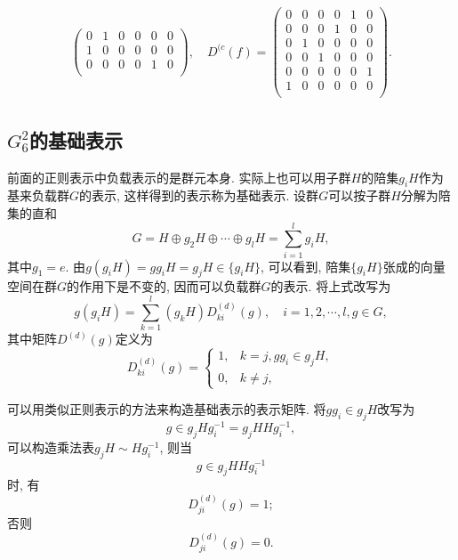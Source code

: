 \documentclass[UTF8]{ctexart}
\begin{document}
\begin{gather}
\begin{pmatrix}
    0 & 1 & 0 & 0 & 0 & 0 \\
    1 & 0 & 0 & 0 & 0 & 0 \\
    0 & 0 & 0 & 0 & 1 & 0 \\
  \end{pmatrix}, \quad
  D^{(c}(f) =
  \begin{pmatrix}
    0 & 0 & 0 & 0 & 1 & 0 \\
    0 & 0 & 0 & 1 & 0 & 0 \\
    0 & 1 & 0 & 0 & 0 & 0 \\
    0 & 0 & 1 & 0 & 0 & 0 \\
    0 & 0 & 0 & 0 & 0 & 1 \\
    1 & 0 & 0 & 0 & 0 & 0 \\
  \end{pmatrix}.
\end{gather}
\subsection{$G_6^2$的基础表示}
前面的正则表示中负载表示的是群元本身. 实际上也可以用子群$H$的陪集$g_i H$作为基来负载群$G$的表示, 这样得到的表示称为基础表示. 设群$G$可以按子群$H$分解为陪集的直和
\begin{equation}
  G = H \oplus g_2 H \oplus \cdots \oplus g_l H = \sum_{i = 1}^{l} g_i H,
\end{equation}
其中$g_1 = e$. 由$g(g_i H) = gg_i H = g_j H \in \{g_i H\}$, 可以看到, 陪集$\{g_i H\}$张成的向量空间在群$G$的作用下是不变的, 因而可以负载群$G$的表示. 将上式改写为
\begin{equation}
  g(g_i H) = \sum_{k = 1}^{l} (g_k H) D_{ki}^{(d)} (g), \quad i = 1, 2, \cdots, l , g \in G,
\end{equation}
其中矩阵$D^{(d)}(g)$定义为
\begin{equation}
  D_{ki}^{(d)} (g) =
  \begin{cases}
    1, & k = j, gg_i \in g_j H, \\
    0, & k \neq j,
  \end{cases}
\end{equation}

可以用类似正则表示的方法来构造基础表示的表示矩阵. 将$gg_i \in g_j H$改写为
\begin{equation}
  g \in g_j H g_i^{-1} = g_j H H g_i^{-1},
\end{equation}
可以构造乘法表$g_j H \sim H g_i^{-1}$, 则当
\begin{equation}
  g \in g_j H H g_i^{-1}
\end{equation}
时, 有
\begin{equation}
  D_{ji}^{(d)} (g) = 1;
\end{equation}
否则
\begin{equation}
  D_{ji}^{(d)} (g) = 0.
\end{equation}
\end{document}
